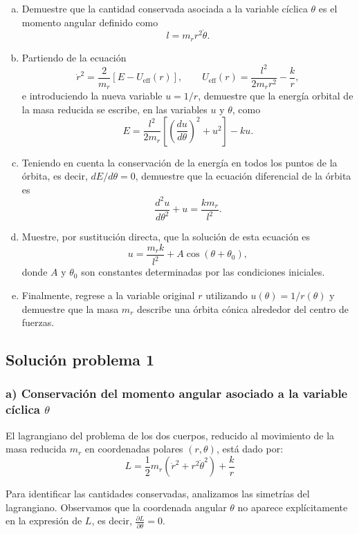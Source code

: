 \documentclass[a4paper]{article}
\begin{document}
\begin{enumerate}[a)]
    \item Demuestre que la cantidad conservada asociada a la variable cíclica $\theta$ es el momento angular definido como
    $$l = m_r r^2 \dot{\theta}.$$
    
    \item Partiendo de la ecuación
    $$\dot{r}^2 = \frac{2}{m_r} \left[E - U_{\text{eff}}(r)\right], \qquad U_{\text{eff}}(r) = \frac{l^2}{2m_r r^2} - \frac{k}{r},$$
    e introduciendo la nueva variable $u = 1/r$, demuestre que la energía orbital de la masa reducida se escribe, en las variables $u$ y $\theta$, como
    $$E = \frac{l^2}{2m_r} \left[ \left(\frac{du}{d\theta}\right)^2 + u^2 \right] - ku.$$
    
    \item Teniendo en cuenta la conservación de la energía en todos los puntos de la órbita, es decir, $dE/d\theta = 0$, demuestre que la ecuación diferencial de la órbita es
    $$\frac{d^2u}{d\theta^2} + u = \frac{km_r}{l^2}.$$
    
    \item Muestre, por sustitución directa, que la solución de esta ecuación es
    $$u = \frac{m_r k}{l^2} + A\cos(\theta + \theta_0),$$
    donde $A$ y $\theta_0$ son constantes determinadas por las condiciones iniciales.
    
    \item Finalmente, regrese a la variable original $r$ utilizando $u(\theta) = 1/r(\theta)$ y demuestre que la masa $m_r$ describe una órbita cónica alrededor del centro de fuerzas.
\end{enumerate}

\subsection{Solución problema 1}

\subsubsection*{a) Conservación del momento angular asociado a la variable cíclica $\theta$}

El lagrangiano del problema de los dos cuerpos, reducido al movimiento de la masa reducida $m_r$ en coordenadas polares $(r, \theta)$, está dado por:
$$L = \frac{1}{2}m_r \left(\dot{r}^2 + r^2\dot{\theta}^2\right) + \frac{k}{r}$$

Para identificar las cantidades conservadas, analizamos las simetrías del lagrangiano. Observamos que la coordenada angular $\theta$ no aparece explícitamente en la expresión de $L$, es decir, $\frac{\partial L}{\partial \theta} = 0$. 
\end{document}
